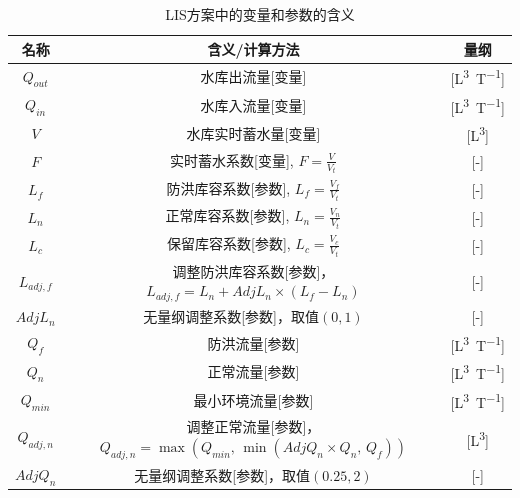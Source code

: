 \begin{table}[htbp]
    \centering
    \caption{LIS方案中的变量和参数的含义}
    \label{tab:LIS方案变量参数表}
    \begin{tabular}{ccc}
    \toprule
    名称 & 含义/计算方法 & 量纲 \\ \midrule
    $Q_{out}$  & 水库出流量[变量]  &
    [\unit{L^3.T^{-1}}]  \\   $Q_{in}$ & 水库入流量[变量] & [\unit{L^3.T^{-1}}] \\
    $V$ & 水库实时蓄水量[变量] & [\unit{L^3}] \\
    $F$  &  实时蓄水系数[变量], $F=\frac{V}{V_{t}}$ & [-] \\
    $L_{f}$ & 防洪库容系数[参数], $L_{f}=\frac{V_{f}}{V_{t}}$ &[-] \\
    $L_{n}$  & 正常库容系数[参数], $L_{n}=\frac{V_{n}}{V_{t}}$ & [-]  \\
    $L_{c}$  & 保留库容系数[参数], $L_{c}=\frac{V_{c}}{V_{t}}$ & [-]  \\
    $L_{adj,f}$ & \makecell{调整防洪库容系数[参数]，\\$L_{adj,f} = L_{n}+AdjL_{n} \times \left(L_{f}-L_{n}\right)$} & [-]  \\
    $AdjL_{n}$ & 无量纲调整系数[参数]，取值$\left(0,1\right)$ & [-]  \\
    $Q_{f}$ & 防洪流量[参数] & [\unit{L^3.T^{-1}}]  \\
    $Q_{n}$ & 正常流量[参数] & [\unit{L^3.T^{-1}}]  \\
    $Q_{min}$ & 最小环境流量[参数] & [\unit{L^3.T^{-1}}] \\
    $Q_{adj,n}$ & \makecell{调整正常流量[参数]，\\$Q_{adj,n}=\max(Q_{min},\,\min(AdjQ_{n} \times Q_{n},\,Q_{f}))$} & [\unit{L^3}] \\
    $AdjQ_{n}$ & 无量纲调整系数[参数]，取值$\left(0.25,2\right)$ &
    [-]\\
    \bottomrule
    \end{tabular}
\end{table}

